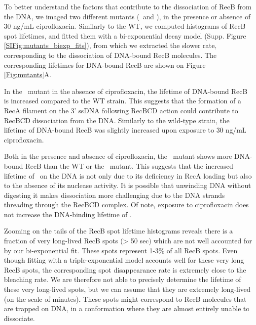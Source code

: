 To better understand the factors that contribute to the dissociation of RecB from the DNA, we imaged two different mutants (\dreca\ and \teneighty), in the presence or absence of 30 ng/mL ciprofloxacin. Similarly to the WT, we computed histograms of RecB spot lifetimes, and fitted them with a bi-exponential decay model (Supp. Figure \ref{SIFig:mutants_biexp_fits}), from which we extracted the slower rate, corresponding to the dissociation of DNA-bound RecB molecules. The corresponding lifetimes for DNA-bound RecB are shown on Figure \ref{Fig:mutants}A.

In the \dreca\ mutant in the absence of ciprofloxacin, the lifetime of DNA-bound RecB is increased compared to the WT strain. This suggests that the formation of a RecA filament on the 3' ssDNA following RecBCD action could contribute to RecBCD dissociation from the DNA. Similarly to the wild-type strain, the lifetime of DNA-bound RecB was slightly increased upon exposure to 30 ng/mL ciprofloxacin.

Both in the presence and absence of ciprofloxacin, the \teneighty\ mutant shows more DNA-bound RecB than the WT or the \dreca\ mutant. This suggests that the increased lifetime of \teneighty\ on the DNA is not only due to its deficiency in RecA loading but also to the absence of its nuclease activity. It is possible that unwinding DNA without digesting it makes dissociation more challenging due to the DNA strands threading through the RecBCD complex. Of note, exposure to ciprofloxacin does not increase the DNA-binding lifetime of \teneighty.

Zooming on the tails of the RecB spot lifetime histograms reveals there is a fraction of very long-lived RecB spots (> 50 sec) which are not well accounted for by our bi-exponential fit. These spots represent 1-3\% of all RecB spots. Even though fitting with a triple-exponential model accounts well for these very long RecB spots, the corresponding spot disappearance rate is extremely close to the bleaching rate. We are therefore not able to precisely determine the lifetime of these very long-lived spots, but we can assume that they are extremely long-lived (on the scale of minutes). These spots might correspond to RecB molecules that are trapped on DNA, in a conformation where they are almost entirely unable to dissociate.

